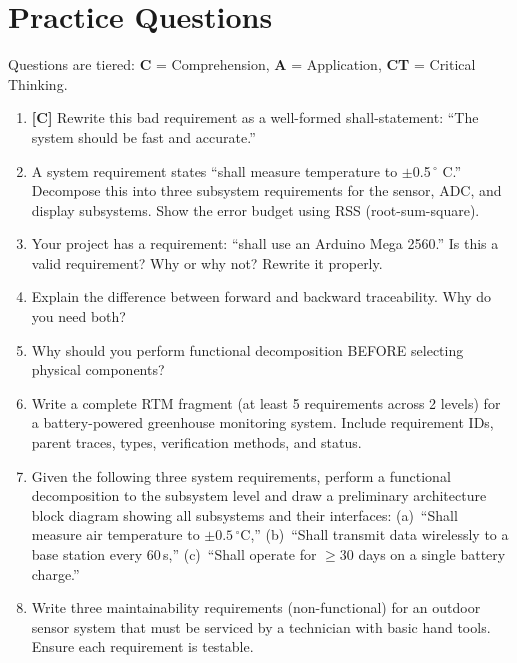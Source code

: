 \documentclass[11pt,letterpaper,twoside,openany]{book}
\newcommand{\degC}{\ensuremath{{}^{\circ}\text{C}}}
\begin{document}
\section{Practice Questions}
Questions are tiered: \textbf{C} = Comprehension, \textbf{A} = Application, \textbf{CT} = Critical Thinking.
\begin{enumerate}[leftmargin=1.5em]
\item \textbf{[C]} Rewrite this bad requirement as a well-formed shall-statement: ``The system should be fast and accurate.''
\item A system requirement states ``shall measure temperature to $\pm$0.5\,$^{\circ}$ C.'' Decompose this into three subsystem requirements for the sensor, ADC, and display subsystems. Show the error budget using RSS (root-sum-square).
\item Your project has a requirement: ``shall use an Arduino Mega 2560.'' Is this a valid requirement? Why or why not? Rewrite it properly.
\item Explain the difference between forward and backward traceability. Why do you need both?
\item Why should you perform functional decomposition BEFORE selecting physical components?
\item Write a complete RTM fragment (at least 5 requirements across 2 levels) for a battery-powered greenhouse monitoring system. Include requirement IDs, parent traces, types, verification methods, and status.
\item Given the following three system requirements, perform a functional decomposition to the subsystem level and draw a preliminary architecture block diagram showing all subsystems and their interfaces: (a)~``Shall measure air temperature to $\pm 0.5$\,\degC,'' (b)~``Shall transmit data wirelessly to a base station every 60\,s,'' (c)~``Shall operate for $\geq$30 days on a single battery charge.''
\item Write three maintainability requirements (non-functional) for an outdoor sensor system that must be serviced by a technician with basic hand tools. Ensure each requirement is testable.
\end{enumerate}
\end{document}
